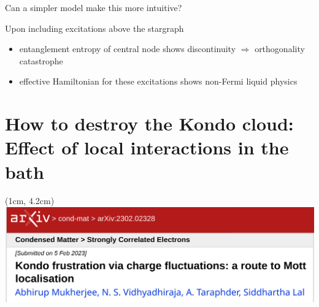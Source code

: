 \documentclass[10pt,aspectratio=169]{beamer}
\begin{document}
\begin{frame}{Can a simpler model make this more intuitive?}
{\begin{minipage}{0.4\textwidth}
\end{minipage}
\hspace*{\fill}
\begin{minipage}{0.55\textwidth}
Upon including excitations above the stargraph\\
\begin{itemize}
	\item entanglement entropy of central node shows \alert{discontinuity} \(\Longrightarrow\) orthogonality catastrophe\\[10pt]
	\item effective Hamiltonian for these excitations shows \alert{non-Fermi liquid} physics
\end{itemize}
\end{minipage}
}
\end{frame}

\section{How to destroy the Kondo cloud:\\
Effect of local interactions in the bath}
\begin{textblock*}{\textwidth}(1cm, 4.2cm)
\includegraphics[width=\textwidth]{esiam_arxiv.pdf}\\
\end{textblock*}
\subsection{~}
\end{document}
